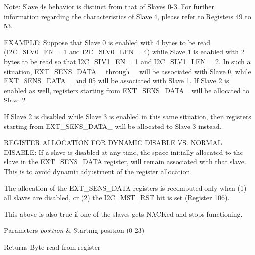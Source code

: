 Note\+: Slave 4\textquotesingle{}s behavior is distinct from that of Slaves 0-\/3. For further information regarding the characteristics of Slave 4, please refer to Registers 49 to 53.

E\+X\+A\+M\+P\+LE\+: Suppose that Slave 0 is enabled with 4 bytes to be read (I2\+C\+\_\+\+S\+L\+V0\+\_\+\+EN = 1 and I2\+C\+\_\+\+S\+L\+V0\+\_\+\+L\+EN = 4) while Slave 1 is enabled with 2 bytes to be read so that I2\+C\+\_\+\+S\+L\+V1\+\_\+\+EN = 1 and I2\+C\+\_\+\+S\+L\+V1\+\_\+\+L\+EN = 2. In such a situation, E\+X\+T\+\_\+\+S\+E\+N\+S\+\_\+\+D\+A\+TA \+\_ through \+\_ will be associated with Slave 0, while E\+X\+T\+\_\+\+S\+E\+N\+S\+\_\+\+D\+A\+TA \+\_ and 05 will be associated with Slave 1. If Slave 2 is enabled as well, registers starting from E\+X\+T\+\_\+\+S\+E\+N\+S\+\_\+\+D\+A\+T\+A\+\_ will be allocated to Slave 2.

If Slave 2 is disabled while Slave 3 is enabled in this same situation, then registers starting from E\+X\+T\+\_\+\+S\+E\+N\+S\+\_\+\+D\+A\+T\+A\+\_ will be allocated to Slave 3 instead.

R\+E\+G\+I\+S\+T\+ER A\+L\+L\+O\+C\+A\+T\+I\+ON F\+OR D\+Y\+N\+A\+M\+IC D\+I\+S\+A\+B\+LE VS. N\+O\+R\+M\+AL D\+I\+S\+A\+B\+LE\+: If a slave is disabled at any time, the space initially allocated to the slave in the E\+X\+T\+\_\+\+S\+E\+N\+S\+\_\+\+D\+A\+TA register, will remain associated with that slave. This is to avoid dynamic adjustment of the register allocation.

The allocation of the E\+X\+T\+\_\+\+S\+E\+N\+S\+\_\+\+D\+A\+TA registers is recomputed only when (1) all slaves are disabled, or (2) the I2\+C\+\_\+\+M\+S\+T\+\_\+\+R\+ST bit is set (Register 106).

This above is also true if one of the slaves gets N\+A\+C\+Ked and stops functioning.


\begin{DoxyParams}{Parameters}
{\em position} & Starting position (0-\/23) \\
\hline
\end{DoxyParams}
\begin{DoxyReturn}{Returns}
Byte read from register 
\end{DoxyReturn}
